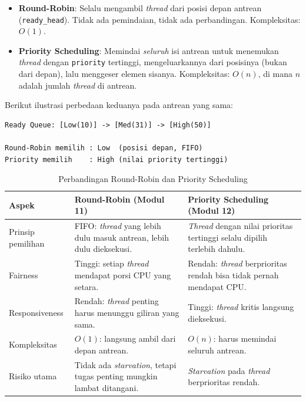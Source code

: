 \begin{itemize}
	\item \textbf{Round-Robin}: Selalu mengambil \textit{thread} dari posisi depan antrean (\texttt{ready\_head}). Tidak ada pemindaian, tidak ada perbandingan. Kompleksitas: $O(1)$.
	\item \textbf{Priority Scheduling}: Memindai \textit{seluruh} isi antrean untuk menemukan \textit{thread} dengan \texttt{priority} tertinggi, mengeluarkannya dari posisinya (bukan dari depan), lalu menggeser elemen sisanya. Kompleksitas: $O(n)$, di mana $n$ adalah jumlah \textit{thread} di antrean.
\end{itemize}

Berikut ilustrasi perbedaan keduanya pada antrean yang sama:

\begin{lstlisting}[caption={Ilustrasi perbedaan pemilihan thread}]
Ready Queue: [Low(10)] -> [Med(31)] -> [High(50)]

Round-Robin memilih : Low  (posisi depan, FIFO)
Priority memilih    : High (nilai priority tertinggi)
\end{lstlisting}

\begin{table}[htbp]
	\centering
	\caption{Perbandingan Round-Robin dan Priority Scheduling}
	\label{tab:m12-perbandingan}
	\begin{tabulary}{\textwidth}{|L|L|L|}
		\hline
		\textbf{Aspek} & \textbf{Round-Robin (Modul 11)} & \textbf{Priority Scheduling (Modul 12)} \\ \hline
		Prinsip pemilihan
		& FIFO: \textit{thread} yang lebih dulu masuk antrean, lebih dulu dieksekusi.
		& \textit{Thread} dengan nilai prioritas tertinggi selalu dipilih terlebih dahulu. \\ \hline
		Fairness
		& Tinggi: setiap \textit{thread} mendapat porsi CPU yang setara.
		& Rendah: \textit{thread} berprioritas rendah bisa tidak pernah mendapat CPU. \\ \hline
		Responsiveness
		& Rendah: \textit{thread} penting harus menunggu giliran yang sama.
		& Tinggi: \textit{thread} kritis langsung dieksekusi. \\ \hline
		Kompleksitas
		& $O(1)$: langsung ambil dari depan antrean.
		& $O(n)$: harus memindai seluruh antrean. \\ \hline
		Risiko utama
		& Tidak ada \textit{starvation}, tetapi tugas penting mungkin lambat ditangani.
		& \textit{Starvation} pada \textit{thread} berprioritas rendah. \\ \hline
	\end{tabulary}
\end{table}

